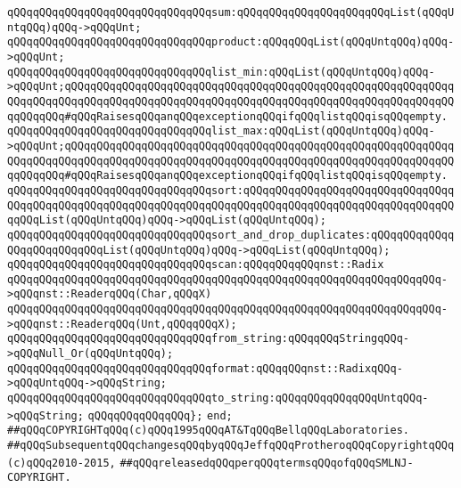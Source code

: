 \newline
\verb|qQQqqQQqqQQqqQQqqQQqqQQqqQQqqQQqsum:qQQqqQQqqQQqqQQqqQQqqQQqList(qQQqUntqQQq)qQQq->qQQqUnt;|\newline
\verb|qQQqqQQqqQQqqQQqqQQqqQQqqQQqqQQqproduct:qQQqqQQqList(qQQqUntqQQq)qQQq->qQQqUnt;|\newline
\newline
\verb|qQQqqQQqqQQqqQQqqQQqqQQqqQQqqQQqlist_min:qQQqList(qQQqUntqQQq)qQQq->qQQqUnt;qQQqqQQqqQQqqQQqqQQqqQQqqQQqqQQqqQQqqQQqqQQqqQQqqQQqqQQqqQQqqQQqqQQqqQQqqQQqqQQqqQQqqQQqqQQqqQQqqQQqqQQqqQQqqQQqqQQqqQQqqQQqqQQqqQQqqQQqqQQq#qQQqRaisesqQQqanqQQqexceptionqQQqifqQQqlistqQQqisqQQqempty.|\newline
\verb|qQQqqQQqqQQqqQQqqQQqqQQqqQQqqQQqlist_max:qQQqList(qQQqUntqQQq)qQQq->qQQqUnt;qQQqqQQqqQQqqQQqqQQqqQQqqQQqqQQqqQQqqQQqqQQqqQQqqQQqqQQqqQQqqQQqqQQqqQQqqQQqqQQqqQQqqQQqqQQqqQQqqQQqqQQqqQQqqQQqqQQqqQQqqQQqqQQqqQQqqQQqqQQq#qQQqRaisesqQQqanqQQqexceptionqQQqifqQQqlistqQQqisqQQqempty.|\newline
\newline
\verb|qQQqqQQqqQQqqQQqqQQqqQQqqQQqqQQqsort:qQQqqQQqqQQqqQQqqQQqqQQqqQQqqQQqqQQqqQQqqQQqqQQqqQQqqQQqqQQqqQQqqQQqqQQqqQQqqQQqqQQqqQQqqQQqqQQqqQQqqQQqqQQqList(qQQqUntqQQq)qQQq->qQQqList(qQQqUntqQQq);|\newline
\verb|qQQqqQQqqQQqqQQqqQQqqQQqqQQqqQQqsort_and_drop_duplicates:qQQqqQQqqQQqqQQqqQQqqQQqqQQqList(qQQqUntqQQq)qQQq->qQQqList(qQQqUntqQQq);|\newline
\newline
\verb|qQQqqQQqqQQqqQQqqQQqqQQqqQQqqQQqscan:qQQqqQQqqQQqnst::Radix|\newline
\verb|qQQqqQQqqQQqqQQqqQQqqQQqqQQqqQQqqQQqqQQqqQQqqQQqqQQqqQQqqQQqqQQqqQQq->qQQqnst::ReaderqQQq(Char,qQQqX)|\newline
\verb|qQQqqQQqqQQqqQQqqQQqqQQqqQQqqQQqqQQqqQQqqQQqqQQqqQQqqQQqqQQqqQQqqQQq->qQQqnst::ReaderqQQq(Unt,qQQqqQQqX);|\newline
\newline
\verb|qQQqqQQqqQQqqQQqqQQqqQQqqQQqqQQqfrom_string:qQQqqQQqStringqQQq->qQQqNull_Or(qQQqUntqQQq);|\newline
\newline
\verb|qQQqqQQqqQQqqQQqqQQqqQQqqQQqqQQqformat:qQQqqQQqnst::RadixqQQq->qQQqUntqQQq->qQQqString;|\newline
\verb|qQQqqQQqqQQqqQQqqQQqqQQqqQQqqQQqto_string:qQQqqQQqqQQqqQQqUntqQQq->qQQqString;|\newline
\newline
\verb|qQQqqQQqqQQqqQQq};|\newline
\verb|end;|\newline
\newline
\newline
\newline
\verb|##qQQqCOPYRIGHTqQQq(c)qQQq1995qQQqAT&TqQQqBellqQQqLaboratories.|\newline
\verb|##qQQqSubsequentqQQqchangesqQQqbyqQQqJeffqQQqProtheroqQQqCopyrightqQQq(c)qQQq2010-2015,|\newline
\verb|##qQQqreleasedqQQqperqQQqtermsqQQqofqQQqSMLNJ-COPYRIGHT.|\newline

